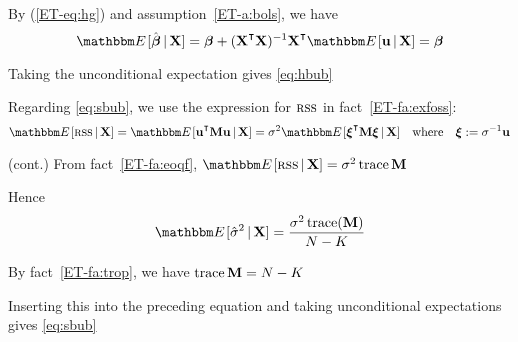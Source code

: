 \begin{frame}

    \vspace{2em}
    \Prf
    By (\ref{ET-eq:hg}) and assumption~\ref{ET-a:bols}, we have
        $$\EE [ \hboldbeta \given \boldX ] 
        = \boldbeta 
            + (\boldX^\T \boldX)^{-1} \boldX^\T \EE [ \boldu \given \boldX ] 
        = \boldbeta $$
        
    Taking the unconditional expectation gives \eqref{eq:hbub}

    Regarding \eqref{eq:sbub}, we use the expression for $\textrm{{\sc rss}}$ in
    fact~\ref{ET-fa:exfoss}:
    \begin{equation*}
        \EE [\rss \given \boldX]
        = \EE [\boldu^\T \boldM \boldu \given \boldX]
        = \sigma^2 \EE [\boldxi^\T \boldM \boldxi \given \boldX]
        \quad \text{where} \quad
        \boldxi := \sigma^{-1} \boldu
    \end{equation*}
    
\end{frame}

\begin{frame}

    \vspace{2em}
    \Prf (cont.)
    From fact~\ref{ET-fa:eoqf}, $\EE
    [\rss \given \boldX] = \sigma^2 \trace \boldM$
    
    Hence
    \begin{equation*}
        \EE [ \hat \sigma^2 \given \boldX ]
        = \frac{\sigma^2 \trace(\boldM)}{N - K} 
    \end{equation*}
    
    \vspace{.7em}
    By fact~\ref{ET-fa:trop}, we have $\operatorname{trace} \mathbf M = N - K$
    
    Inserting this into the preceding equation and taking unconditional
    expectations gives \eqref{eq:sbub}  \qedsymbol
    
\end{frame}

